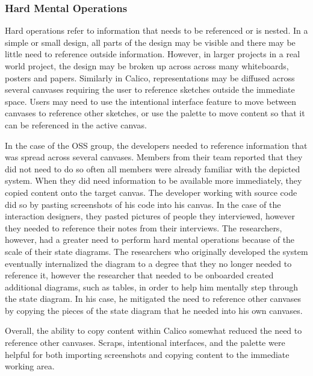 \subsubsection{Hard Mental Operations}
Hard operations refer to information that needs to be referenced or is nested. In a simple or small design, all parts of the design may be visible and there may be little need to reference outside information. However, in larger projects in a real world project, the design may be broken up across across many whiteboards, posters and papers. Similarly in Calico, representations may be diffused across several canvases requiring the user to reference sketches outside the immediate space. Users may need to use the intentional interface feature to move between canvases to reference other sketches, or use the palette to move content so that it can be referenced in the active canvas.

In the case of the OSS group, the developers needed to reference information that was spread across several canvases. Members from their team reported that they did not need to do so often all members were already familiar with the depicted system. When they did need information to be available more immediately, they copied content onto the target canvas. The developer working with source code did so by pasting screenshots of his code into his canvas. In the case of the interaction designers, they pasted pictures of people they interviewed, however they needed to reference their notes from their interviews. The researchers, however, had a greater need to perform hard mental operations because of the scale of their state diagrams. The researchers who originally developed the system eventually internalized the diagram to a degree that they no longer needed to reference it, however the researcher that needed to be onboarded created additional diagrams, such as tables, in order to help him mentally step through the state diagram. In his case, he mitigated the need to reference other canvases by copying the pieces of the state diagram that he needed into his own canvases.

Overall, the ability to copy content within Calico somewhat reduced the need to reference other canvases. Scraps, intentional interfaces, and the palette were helpful for both importing screenshots and copying content to the immediate working area.

%

